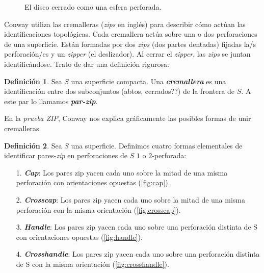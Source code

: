 \documentclass[10pt]{report}
\newcommand{\enfatiza}[1]{\textbf{\textit{#1}}}
\theoremstyle{definition}
\newtheorem{defin}{Definición}[section]
\begin{document}
\begin{figure}[h]%
\centering
{}
\caption{El disco cerrado como una esfera perforada.\label{fig:disco_esfera_perforada}}
\end{figure}


Conway utiliza las cremalleras (\textit{zips} en inglés) para describir cómo actúan las identificaciones topológicas. Cada cremallera actúa sobre una o dos perforaciones de una superficie. Están formadas por dos \textit{zips} (dos partes dentadas) fijadas la/s perforación/es y un \textit{zipper} (el deslizador). Al cerrar el \textit{zipper}, las \textit{zips} se juntan identificándose. Trato de dar una definición rigurosa:


\begin{defin}%
Sea $S$ una superficie compacta. Una \enfatiza{cremallera} es una identificación entre dos subconjuntos (abtos, cerrados??) de la frontera de $S$. A este par lo llamamos \enfatiza{par-zip}.
\end{defin}


En la \textit{prueba ZIP}, Conway nos explica gráficamente las posibles formas de unir cremalleras. 

\begin{defin}
Sea $S$ una superficie. Definimos cuatro formas elementales de identificar pares-\textit{zip} en perforaciones de 
$S$ $1$ o $2$-perforada:

\begin{itemize}
\item[1.] \enfatiza{Cap}: Los pares zip yacen cada uno sobre la mitad de una misma perforación con orientaciones opuestas (\autoref{fig:cap}).
\item[2.] \enfatiza{Crosscap}: Los pares zip yacen cada uno sobre la mitad de una misma perforación con la misma orientación (\autoref{fig:crosscap}).
\item[3.] \enfatiza{Handle}: Los pares zip yacen cada uno sobre una perforación distinta de S con orientaciones opuestas (\autoref{fig:handle}).
\item[4.] \enfatiza{Crosshandle}: Los pares zip yacen cada uno sobre una perforación distinta de S con la misma orientación (\autoref{fig:crosshandle}).
\end{itemize}
\end{defin}
\end{document}
